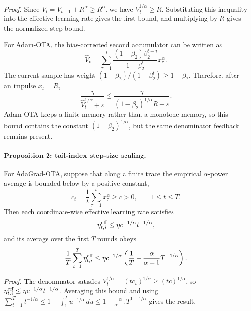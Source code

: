 \noindent\emph{Proof.}
Since $V_t=V_{t-1}+R^\alpha\geq R^\alpha$, we have
$V_t^{1/\alpha}\geq R$. Substituting this inequality into the effective
learning rate gives the first bound, and multiplying by $R$ gives the
normalized-step bound.

For Adam-OTA, the bias-corrected second accumulator can be written as
\begin{equation}
    \hat V_t
    = \sum_{\tau=1}^{t}
    \frac{(1-\beta_2)\beta_2^{t-\tau}}{1-\beta_2^t}
    x_\tau^\alpha .
\end{equation}
The current sample has weight
$(1-\beta_2)/(1-\beta_2^t)\geq 1-\beta_2$. Therefore, after an impulse
$x_t=R$,
\begin{equation}
    \frac{\eta}{\hat V_t^{1/\alpha}+\varepsilon}
    \leq
    \frac{\eta}{(1-\beta_2)^{1/\alpha}R+\varepsilon}.
\end{equation}
Adam-OTA keeps a finite memory rather than a monotone memory, so this bound
contains the constant $(1-\beta_2)^{1/\alpha}$, but the same denominator
feedback remains present.

\paragraph{Proposition 2: tail-index step-size scaling.}
For AdaGrad-OTA, suppose that along a finite trace the empirical
$\alpha$-power average is bounded below by a positive constant,
\begin{equation}
    c_t=\frac{1}{t}\sum_{\tau=1}^{t}x_\tau^\alpha \geq c>0,
    \qquad 1\leq t\leq T.
\end{equation}
Then each coordinate-wise effective learning rate satisfies
\begin{equation}
    \eta_{t,i}^{\rm eff}
    \leq
    \eta c^{-1/\alpha}t^{-1/\alpha},
\end{equation}
and its average over the first $T$ rounds obeys
\begin{equation}
    \frac{1}{T}\sum_{t=1}^{T}\eta_{t,i}^{\rm eff}
    \leq
    \eta c^{-1/\alpha}
    \left(\frac{1}{T}+\frac{\alpha}{\alpha-1}T^{-1/\alpha}\right).
\end{equation}

\noindent\emph{Proof.}
The denominator satisfies
$V_t^{1/\alpha}=(t c_t)^{1/\alpha}\geq (tc)^{1/\alpha}$, so
$\eta_{t,i}^{\rm eff}\leq\eta c^{-1/\alpha}t^{-1/\alpha}$. Averaging this
bound and using
$\sum_{t=1}^{T}t^{-1/\alpha}\leq
1+\int_1^T u^{-1/\alpha}\,du
\leq 1+\frac{\alpha}{\alpha-1}T^{1-1/\alpha}$
gives the result.

